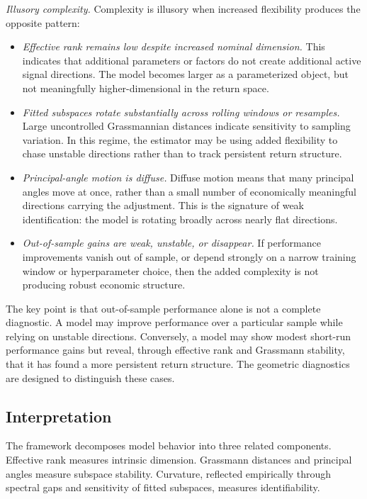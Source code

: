 \documentclass[11pt,letterpaper]{article}
\begin{document}
\smallskip\noindent
\textit{Illusory complexity.}
Complexity is illusory when increased flexibility produces the opposite pattern:
\begin{itemize}
\item[(i)] \emph{Effective rank remains low despite increased nominal dimension.}
This indicates that additional parameters or factors do not create additional active signal directions. The model becomes larger as a parameterized object, but not meaningfully higher-dimensional in the return space.

\item[(ii)] \emph{Fitted subspaces rotate substantially across rolling windows or resamples.}
Large uncontrolled Grassmannian distances indicate sensitivity to sampling variation. In this regime, the estimator may be using added flexibility to chase unstable directions rather than to track persistent return structure.

\item[(iii)] \emph{Principal-angle motion is diffuse.}
Diffuse motion means that many principal angles move at once, rather than a small number of economically meaningful directions carrying the adjustment. This is the signature of weak identification: the model is rotating broadly across nearly flat directions.

\item[(iv)] \emph{Out-of-sample gains are weak, unstable, or disappear.}
If performance improvements vanish out of sample, or depend strongly on a narrow training window or hyperparameter choice, then the added complexity is not producing robust economic structure.
\end{itemize}

The key point is that out-of-sample performance alone is not a complete diagnostic. A model may improve performance over a particular sample while relying on unstable directions. Conversely, a model may show modest short-run performance gains but reveal, through effective rank and Grassmann stability, that it has found a more persistent return structure. The geometric diagnostics are designed to distinguish these cases.

\subsection{Interpretation}
\label{subsec:geom-test-interpretation}

The framework decomposes model behavior into three related components. Effective rank measures intrinsic dimension. Grassmann distances and principal angles measure subspace stability. Curvature, reflected empirically through spectral gaps and sensitivity of fitted subspaces, measures identifiability.
\end{document}
